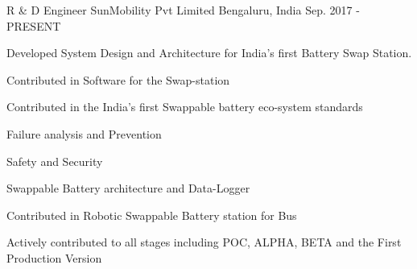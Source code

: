 

\begin{cventries}

  \cventry
    {R \& D Engineer} %
    {SunMobility Pvt Limited} %
    {Bengaluru, India} %
    {Sep. 2017 - PRESENT} %
    {
      \begin{cvitems} %
        \item {Developed System Design and Architecture for India's first Battery Swap Station.}
        \item {Contributed in Software for the Swap-station}
        \item {Contributed in the India's first Swappable battery eco-system standards}
        \item {Failure analysis and Prevention}
        \item {Safety and Security}
        \item {Swappable Battery architecture and Data-Logger}
        \item {Contributed in Robotic Swappable Battery station for Bus}
        \item {Actively contributed to all stages including POC, ALPHA, BETA and the First Production Version}
      \end{cvitems}
    }

\end{cventries}
